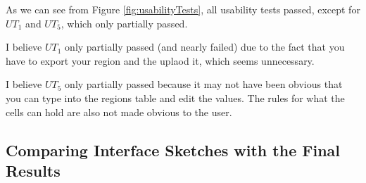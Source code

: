 \documentclass[12pt]{report}
\begin{document}
As we can see from Figure \ref{fig:usabilityTests}, all usability tests passed, except for $UT_{1}$ and $UT_{5}$, which only partially passed.

\begin{center}
\end{center}

I believe $UT_{1}$ only partially passed (and nearly failed) due to the fact that you have to export your region and the uplaod it, which seems unnecessary.

I believe $UT_{5}$ only partially passed because it may not have been obvious that you can type into the regions table and edit the values. The rules for what the cells can hold are also not made obvious to the user.

\subsection{Comparing Interface Sketches with the Final Results}
\end{document}
